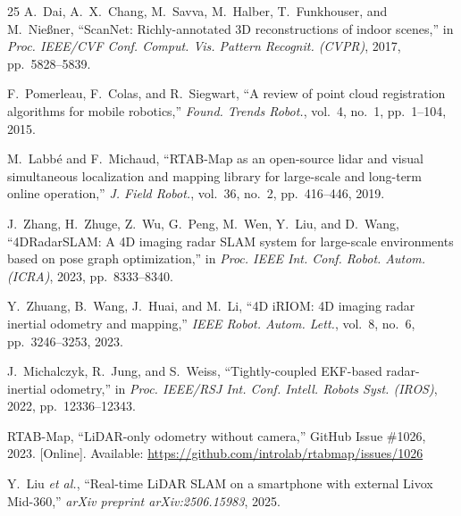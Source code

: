 \documentclass[journal]{IEEEtran}
\begin{document}
\begin{thebibliography}{25}
A.~Dai, A.~X.~Chang, M.~Savva, M.~Halber, T.~Funkhouser, and M.~Nie{\ss}ner, ``ScanNet: Richly-annotated 3D reconstructions of indoor scenes,'' in \textit{Proc. IEEE/CVF Conf. Comput. Vis. Pattern Recognit. (CVPR)}, 2017, pp.~5828--5839.

F.~Pomerleau, F.~Colas, and R.~Siegwart, ``A review of point cloud registration algorithms for mobile robotics,'' \textit{Found. Trends Robot.}, vol.~4, no.~1, pp.~1--104, 2015.

M.~Labb\'{e} and F.~Michaud, ``RTAB-Map as an open-source lidar and visual simultaneous localization and mapping library for large-scale and long-term online operation,'' \textit{J. Field Robot.}, vol.~36, no.~2, pp.~416--446, 2019.

J.~Zhang, H.~Zhuge, Z.~Wu, G.~Peng, M.~Wen, Y.~Liu, and D.~Wang, ``4DRadarSLAM: A 4D imaging radar SLAM system for large-scale environments based on pose graph optimization,'' in \textit{Proc. IEEE Int. Conf. Robot. Autom. (ICRA)}, 2023, pp.~8333--8340.

Y.~Zhuang, B.~Wang, J.~Huai, and M.~Li, ``4D iRIOM: 4D imaging radar inertial odometry and mapping,'' \textit{IEEE Robot. Autom. Lett.}, vol.~8, no.~6, pp.~3246--3253, 2023.

J.~Michalczyk, R.~Jung, and S.~Weiss, ``Tightly-coupled EKF-based radar-inertial odometry,'' in \textit{Proc. IEEE/RSJ Int. Conf. Intell. Robots Syst. (IROS)}, 2022, pp.~12336--12343.

RTAB-Map, ``LiDAR-only odometry without camera,'' GitHub Issue \#1026, 2023. [Online]. Available: \url{https://github.com/introlab/rtabmap/issues/1026}

Y.~Liu \textit{et al.}, ``Real-time LiDAR SLAM on a smartphone with external Livox Mid-360,'' \textit{arXiv preprint arXiv:2506.15983}, 2025.

\end{thebibliography}
\end{document}
